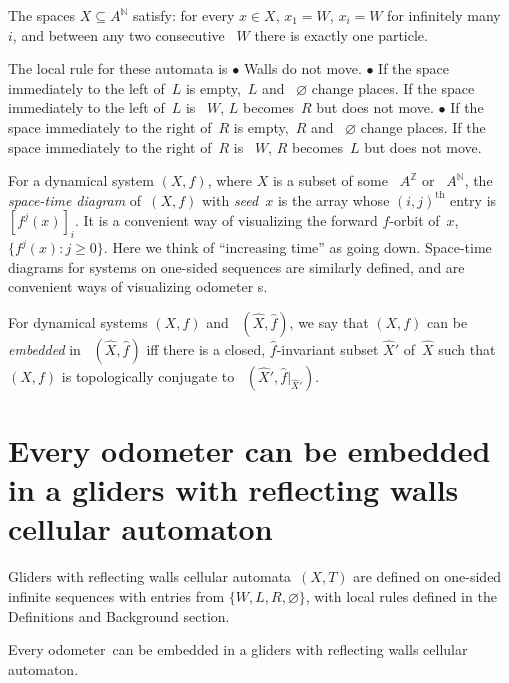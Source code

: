 \documentclass[12pt]{amsart}
\begin{document}
The spaces $X \subseteq A^{\mathbb N}$ satisfy:
for every $x \in X$,
$x_1 = W$,
$x_i = W$ for infinitely many~$i$,
and between any two consecutive ~$W$ there is exactly one particle. 

The local rule for these automata is
\newline\noindent $\bullet$  Walls do not move.
\newline\noindent $\bullet$  If the space immediately to the left of~$L$ is empty,~$L$ and ~$\varnothing$ change places.  If the space immediately to the left of~$L$ is ~$W$, 
$L$ becomes~$R$ but does not move.
\newline\noindent $\bullet$  If the space immediately to the right of~$R$ is empty,~$R$ and ~$\varnothing$ change places.  If the space immediately to the right of~$R$ is ~$W$, $R$ becomes~$L$ but does not move.

\smallskip

For a dynamical system $(X,f)$, where $X$ is a subset of some ~$A^{\mathbb Z}$ or ~$A^{\mathbb N}$,
the \emph{{space-time diagram}\/} of~$(X,f)$ with \emph{seed\/}~$x$
is the array whose $(i,j)^\text{th}$ entry is $[f^j(x)]_i$.
It is a convenient way of visualizing the forward $f$-orbit of~$x$, 
$\{f^j(x):j\ge0\}$.
Here we think of ``increasing time'' as going down.
Space-time diagrams for 
systems on one-sided sequences
are similarly defined, and are convenient ways of visualizing {odometer} s.

For dynamical systems $(X,f)$ and
~$(\widehat X ,\widehat f)$, we say that 
$(X,f)$ can be \emph{embedded\/} in
~$(\widehat X,\widehat f)$ iff  there is a closed, $\widehat f$-invariant subset
$\widehat X'$ of~$\widehat X$ such that $(X,f)$ is topologically conjugate to
~$(\widehat X',{\widehat f}|_{\widehat X'})$.

\section*{Every  odometer can be embedded in a  gliders with reflecting walls {cellular automaton}}

Gliders with reflecting walls {cellular automata}\    $(X,T)$ are  defined on one-sided infinite sequences with entries from
$\{W,L,R,\varnothing\}$,
with local rules defined in the Definitions and Background section.

\begin{Th1}
Every {odometer}\ can be embedded in a  gliders with reflecting walls {cellular automaton}.
\end{Th1}
\end{document}
